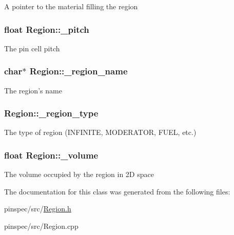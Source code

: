 A pointer to the material filling the region \hypertarget{classRegion_a378e08077c7f1dd45ed10dddf767415b}{
\subsubsection[{\-\_\-pitch}]{\setlength{\rightskip}{0pt plus 5cm}float Region\-::\-\_\-pitch\hspace{0.3cm}{\ttfamily [private]}}}\label{classRegion_a378e08077c7f1dd45ed10dddf767415b}
The pin cell pitch \hypertarget{classRegion_abf94b7a06d6b1500a77b68505868d312}{
\subsubsection[{\-\_\-region\-\_\-name}]{\setlength{\rightskip}{0pt plus 5cm}char$\ast$ Region\-::\-\_\-region\-\_\-name\hspace{0.3cm}{\ttfamily [private]}}}\label{classRegion_abf94b7a06d6b1500a77b68505868d312}
The region's name \hypertarget{classRegion_a83913828a5b45d69aa073bc567a03750}{
\subsubsection[{\-\_\-region\-\_\-type}]{ Region\-::\-\_\-region\-\_\-type\hspace{0.3cm}{\ttfamily [private]}}}\label{classRegion_a83913828a5b45d69aa073bc567a03750}
The type of region (I\-N\-F\-I\-N\-I\-T\-E, M\-O\-D\-E\-R\-A\-T\-O\-R, F\-U\-E\-L, etc.) \hypertarget{classRegion_ad4345a279ed2211c94a73c4bd1f28ba8}{
\subsubsection[{\-\_\-volume}]{\setlength{\rightskip}{0pt plus 5cm}float Region\-::\-\_\-volume\hspace{0.3cm}{\ttfamily [private]}}}\label{classRegion_ad4345a279ed2211c94a73c4bd1f28ba8}
The volume occupied by the region in 2\-D space 

The documentation for this class was generated from the following files\-:\begin{DoxyCompactItemize}
\item 
pinspec/src/\hyperlink{Region_8h}{Region.\-h}\item 
pinspec/src/Region.\-cpp\end{DoxyCompactItemize}
